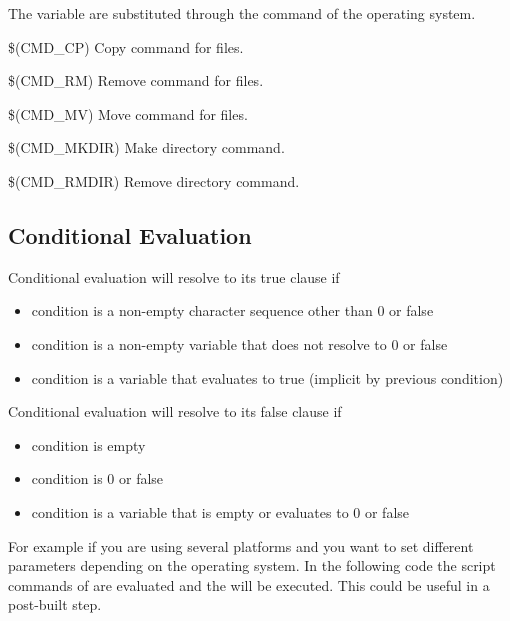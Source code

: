 The variable are substituted through the command of the operating system.

\begin{codeentry}
\item[\$(CMD\_CP)] Copy command for files.
\item[\$(CMD\_RM)] Remove command for files.
\item[\$(CMD\_MV)] Move command for files.
\item[\$(CMD\_MKDIR)] Make directory command.
\item[\$(CMD\_RMDIR)] Remove directory command.
\end{codeentry}

\subsection{Conditional Evaluation}


Conditional evaluation will resolve to its true clause if

\begin{itemize}
\item condition is a non-empty character sequence other than 0 or false
\item condition is a non-empty variable that does not resolve to 0 or false
\item condition is a variable that evaluates to true (implicit by previous condition)
\end{itemize}

Conditional evaluation will resolve to its false clause if

\begin{itemize}
\item condition is empty
\item condition is 0 or false
\item condition is a variable that is empty or evaluates to 0 or false
\end{itemize}



For example if you are using several platforms and you want to set different parameters depending on the operating system. In the following code the script commands of \codeline{[[ ]]} are evaluated and the  will be executed. This could be useful in a post-built step.

